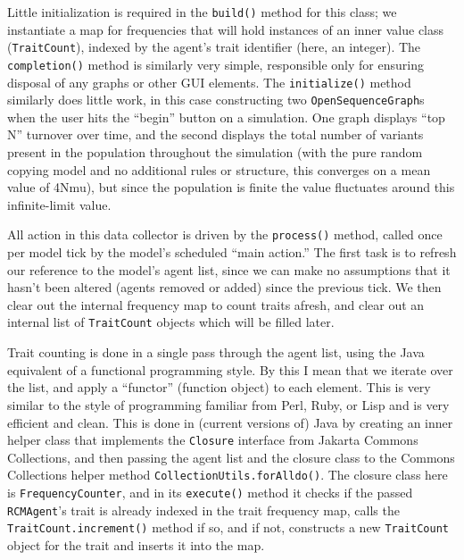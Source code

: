 \documentclass{kluwer-mem-copyright}
\begin{document}
\begin{article}
Little initialization is required in the \texttt{build()} method for this class;
we instantiate a map for frequencies that will hold instances of an inner value
class (\texttt{TraitCount}), indexed by the agent's trait identifier (here, an
integer).  The \texttt{completion()} method is similarly very simple,
responsible only for ensuring disposal of any graphs or other GUI elements.  The
\texttt{initialize()} method similarly does little work, in this case
constructing two \texttt{OpenSequenceGraph}s when the user hits the ``begin''
button on a simulation.  One graph displays ``top N'' turnover over time, and
the second displays the total number of variants present in the population
throughout the simulation (with the pure random copying model and no additional
rules or structure, this converges on a mean value of 4Nmu), but since the
population is finite the value fluctuates around this infinite-limit value.

All action in this data collector is driven by the \texttt{process()} method,
called once per model tick by the model's scheduled ``main action.''  The first
task is to refresh our reference to the model's agent list, since we can make no
assumptions that it hasn't been altered (agents removed or added) since the
previous tick.  We then clear out the internal frequency map to count traits
afresh, and clear out an internal list of \texttt{TraitCount} objects which will
be filled later.  

Trait counting is done in a single pass through the agent list, using the Java
equivalent of a functional programming style.  By this I mean that we iterate
over the list, and apply a ``functor'' (function object) to each element.  This
is very similar to the style of programming familiar from Perl, Ruby, or Lisp
and is very efficient and clean.  This is done in (current versions of) Java by
creating an inner helper class that implements the \texttt{Closure} interface
from Jakarta Commons Collections, and then passing the agent list and the
closure class to the Commons Collections helper method
\texttt{CollectionUtils.forAlldo()}.  The closure class here is
\texttt{FrequencyCounter}, and in its \texttt{execute()} method it checks if the
passed \texttt{RCMAgent}'s trait is already indexed in the trait frequency map,
calls the \texttt{TraitCount.increment()} method if so, and if not, constructs a
new \texttt{TraitCount} object for the trait and inserts it into the map.


\end{article}
\end{document}
